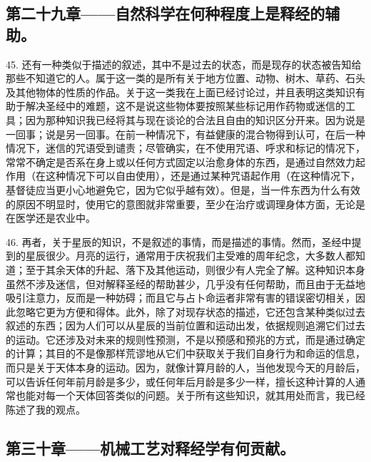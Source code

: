 \subsection{第二十九章——自然科学在何种程度上是释经的辅助。}

45. 还有一种类似于描述的叙述，其中不是过去的状态，而是现存的状态被告知给那些不知道它的人。属于这一类的是所有关于地方位置、动物、树木、草药、石头及其他物体的性质的作品。关于这一类我在上面已经讨论过，并且表明这类知识有助于解决圣经中的难题，这不是说这些物体要按照某些标记用作药物或迷信的工具；因为那种知识我已经将其与现在谈论的合法且自由的知识区分开来。因为说是一回事；说是另一回事。在前一种情况下，有益健康的混合物得到认可，在后一种情况下，迷信的咒语受到谴责；尽管确实，在不使用咒语、呼求和标记的情况下，常常不确定是否系在身上或以任何方式固定以治愈身体的东西，是通过自然效力起作用（在这种情况下可以自由使用），还是通过某种咒语起作用（在这种情况下，基督徒应当更小心地避免它，因为它似乎越有效）。但是，当一件东西为什么有效的原因不明显时，使用它的意图就非常重要，至少在治疗或调理身体方面，无论是在医学还是农业中。\par

46. 再者，关于星辰的知识，不是叙述的事情，而是描述的事情。然而，圣经中提到的星辰很少。月亮的运行，通常用于庆祝我们主受难的周年纪念，大多数人都知道；至于其余天体的升起、落下及其他运动，则很少有人完全了解。这种知识本身虽然不涉及迷信，但对解释圣经的帮助甚少，几乎没有任何帮助，而且由于无益地吸引注意力，反而是一种妨碍；而且它与占卜命运者非常有害的错误密切相关，因此忽略它更为方便和得体。此外，除了对现存状态的描述，它还包含某种类似过去叙述的东西；因为人们可以从星辰的当前位置和运动出发，依据规则追溯它们过去的运动。它还涉及对未来的规则性预测，不是以预感和预兆的方式，而是通过确定的计算；其目的不是像那样荒谬地从它们中获取关于我们自身行为和命运的信息，而只是关于天体本身的运动。因为，就像计算月龄的人，当他发现今天的月龄后，可以告诉任何年前月龄是多少，或任何年后月龄是多少一样，擅长这种计算的人通常也能对每一个天体回答类似的问题。关于所有这些知识，就其用处而言，我已经陈述了我的观点。\par


\subsection{第三十章——机械工艺对释经学有何贡献。}

